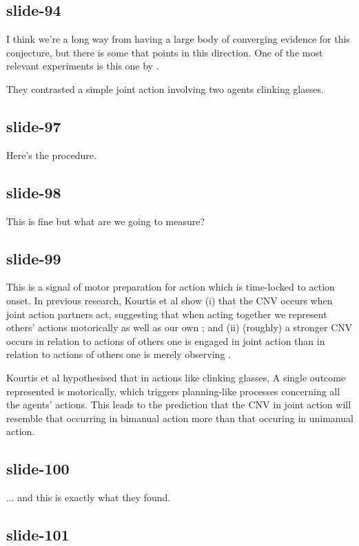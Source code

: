 \documentclass[12pt,\papersize]{extarticle}
\begin{document}
\subsection{slide-94}
I think we're a long way from having a large body of converging evidence for this conjecture,
but there is some that points in this direction.
One of the most relevant experiments is this one by \citet{kourtis:2014_attention}.

They contrasted a simple joint action involving two agents clinking glasses.

\subsection{slide-97}
Here's the procedure.

\subsection{slide-98}
This is fine but what are we going to measure?

\subsection{slide-99}
This is a signal of motor preparation for action which is time-locked to action onset.
In previous research, Kourtis et al show (i) that the CNV occurs when joint action
partners act, suggesting that when acting together we represent others' actions motorically
as well as our own \cite{kourtis:2012_predictive};
and
(ii) (roughly) a stronger CNV occurs in relation to actions of others one is engaged in joint action than
in relation to actions of others one is merely observing \cite{kourtis:2010_favoritism}.

Kourtis et al hypothesised that in actions like clinking glasses,
A single outcome represented is motorically,
which triggers planning-like processes
concerning all the agents' actions.
This leads to the prediction that the CNV in joint action will resemble that occurring in
bimanual action more than that occuring in unimanual action.

\subsection{slide-100}
... and this is exactly what they found.

\subsection{slide-101}
\end{document}
